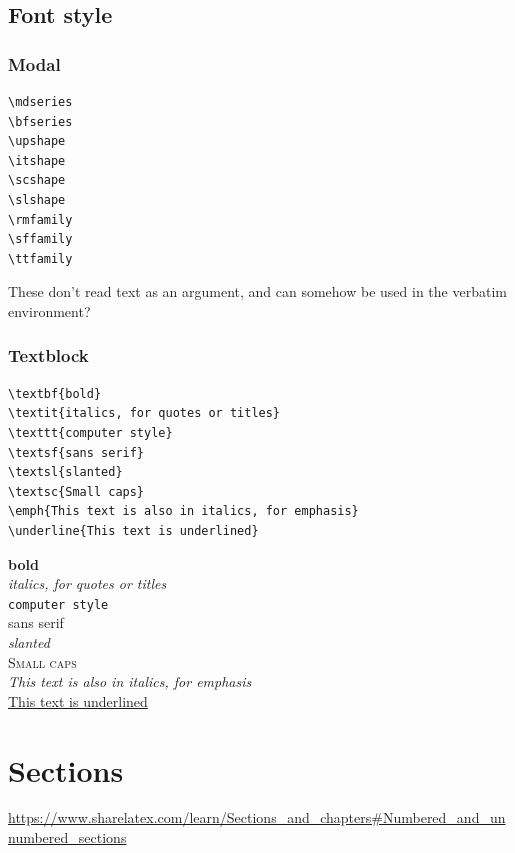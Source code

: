 \documentclass{article}
\begin{document}
\subsection{Font style}
\subsubsection{Modal}
\begin{minipage}[t]{0.5\textwidth}
\begin{verbatim}
\mdseries
\bfseries
\upshape
\itshape
\scshape
\slshape
\rmfamily
\sffamily
\ttfamily
\end{verbatim}
\end{minipage}
\begin{minipage}[t]{0.5\textwidth}
    These don't read text as an argument, and can somehow be
    used in the verbatim environment?
\end{minipage}

\subsubsection{Textblock}
\begin{minipage}[t]{0.5\textwidth}
\begin{verbatim}
\textbf{bold}
\textit{italics, for quotes or titles}
\texttt{computer style}
\textsf{sans serif}
\textsl{slanted}
\textsc{Small caps}
\emph{This text is also in italics, for emphasis}
\underline{This text is underlined}
\end{verbatim}
\end{minipage}
\begin{minipage}[t]{0.5\textwidth}
\textbf{bold}\\
\textit{italics, for quotes or titles}\\
\texttt{computer style}\\
\textsf{sans serif}\\
\textsl{slanted}\\
\textsc{Small caps}\\
\emph{This text is also in italics, for emphasis}\\
\underline{This text is underlined}
\end{minipage}

\newpage
\section{Sections}
\begin{minipage}{\textwidth}
\url{https://www.sharelatex.com/learn/Sections_and_chapters#Numbered_and_unnumbered_sections}
\end{minipage}
\end{document}
